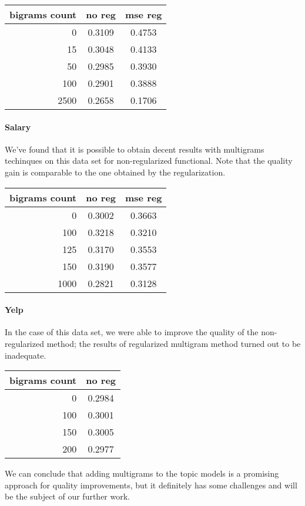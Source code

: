 \documentclass{sig-alternate-2013}
\begin{document}
\begin{tabular}{ |r || c | c| }
  \hline
  bigrams count & no reg & mse reg \\
  \hline
  0 & 0.3109 & 0.4753 \\
  15 & 0.3048 & 0.4133 \\
  50 & 0.2985 & 0.3930 \\
  100 & 0.2901 & 0.3888 \\
  2500 & 0.2658 & 0.1706 \\
  \hline
\end{tabular}

\paragraph{Salary}
We've found that it is possible to obtain decent results with multigrams techinques on this data set
for non-regularized functional.
Note that the quality gain is comparable to the one obtained by the regularization.

\begin{tabular}{ |r || c | c| }
  \hline
  bigrams count & no reg & mse reg \\
  \hline
  0 & 0.3002 & 0.3663 \\
  100 & 0.3218 & 0.3210 \\
  125 & 0.3170 & 0.3553 \\
  150 & 0.3190 & 0.3577 \\
  1000 & 0.2821 & 0.3128 \\
  \hline
\end{tabular}


\paragraph{Yelp}
In the case of this data set, we were able to improve the quality of the non-regularized method;
the results of regularized multigram method turned out to be inadequate.

\begin{tabular}{| r || c| }
  \hline
  bigrams count & no reg\\
  \hline
  0 & 0.2984 \\
  100 & 0.3001 \\
  150 & 0.3005 \\
  200 & 0.2977 \\
  \hline
\end{tabular}

We can conclude that adding multigrams to the topic models
is a promising approach for quality improvements,
but it definitely has some challenges and will be the subject of our further work.
\end{document}
